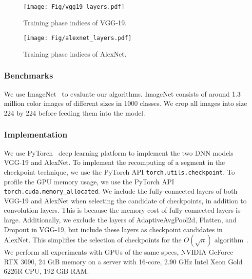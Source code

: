 \begin{figure}[h!]
    \centering
    \texttt{[image: Fig/vgg19\_layers.pdf]}
    \caption{Training phase indices of VGG-19.} 
    \label{fig:vgg19_layers}
\end{figure}
\begin{figure}[h!]
    \centering
    \texttt{[image: Fig/alexnet\_layers.pdf]}
    \caption{Training phase indices of AlexNet.} 
    \label{fig:alexnet_layers}
\end{figure}

\subsubsection{Benchmarks}



We use ImageNet~\cite{russakovsky2015imagenet} to evaluate our algorithms.
ImageNet consists of around 1.3 million color images of different sizes in 1000 classes.
We crop all images into size 224 by 224 before feeding them into the model.

\subsubsection{Implementation}

We use PyTorch~\cite{paszke2019pytorch} deep learning platform to implement the two DNN models VGG-19 and AlexNet.
To implement the recomputing of a segment in the checkpoint technique, we use the PyTorch API \texttt{torch.utils.checkpoint}.
To profile the GPU memory usage, we use the PyTorch API \texttt{torch.cuda.memory\_allocated}.
We include the fully-connected layers of both VGG-19 and AlexNet when selecting the candidate of checkpoints, in addition to convolution layers. 
This is because the memory cost of fully-connected layers is large.
Additionally, we exclude the layers of AdaptiveAvgPool2d, Flatten, and Dropout in VGG-19, but include these layers as checkpoint candidates in AlexNet.
This simplifies the selection of checkpoints for the $O(\sqrt{n})$ algorithm~\cite{chen2016training}.
We perform all experiments with GPUs of the same specs, NVIDIA GeForce RTX 3090, 24 GiB memory on a server with 16-core, 2.90 GHz Intel Xeon Gold 6226R CPU, 192 GiB RAM.


